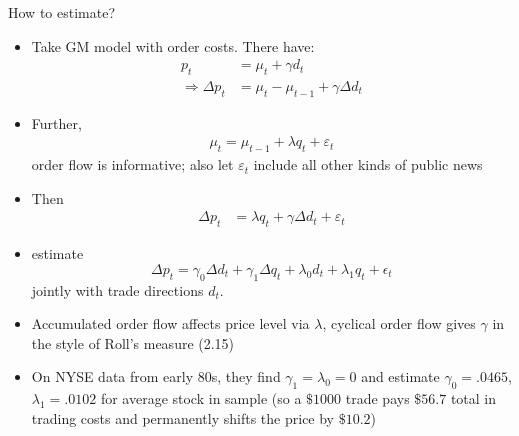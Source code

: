 \documentclass[english,10pt
,aspectratio=169
]{beamer}
\begin{document}
\begin{frame}{How to estimate?}
	\begin{itemize}
		\item Take GM model with order costs. There have:
		\begin{align*}
			p_t &= \mu_t + \gamma d_t
			\\
			\Rightarrow \varDelta p_t &= \mu_t - \mu_{t-1} + \gamma \varDelta d_t
		\end{align*}
		\pause
		\item Further,
		\begin{align*}
			\mu_t = \mu_{t-1} + \lambda q_t + \varepsilon_t
		\end{align*}
		order flow is informative; also let $\varepsilon_t$ include all other kinds of public news
		\item Then
		\begin{align*}
			\varDelta p_t &= \lambda q_t + \gamma \varDelta d_t + \varepsilon_t
		\end{align*}
	\end{itemize}
\end{frame}


\begin{frame}{\cite{glosten_estimating_1988}}
	\begin{itemize}
		\item \textbf{\cite{glosten_estimating_1988}} estimate
		\begin{equation} \tag{5.7}
			\Delta p_t = \gamma_0 \Delta d_t+ \gamma_1 \Delta q_t + \lambda_0 d_t + \lambda_1 q_t + \epsilon_t
		\end{equation}
		jointly with trade directions $d_t$. 
		\item Accumulated order flow affects price level via $\lambda$, cyclical order flow gives $\gamma$ in the style of Roll's measure (2.15)
		\item On NYSE data from early 80s, they find $\gamma_1=\lambda_0=0$ and estimate $\gamma_0=.0465$, $\lambda_1=.0102$ for average stock in sample
		(so a $\$1000$ trade pays $\$56.7$ total in trading costs and permanently shifts the price by $\$10.2$)
	\end{itemize}
\end{frame}
\end{document}
